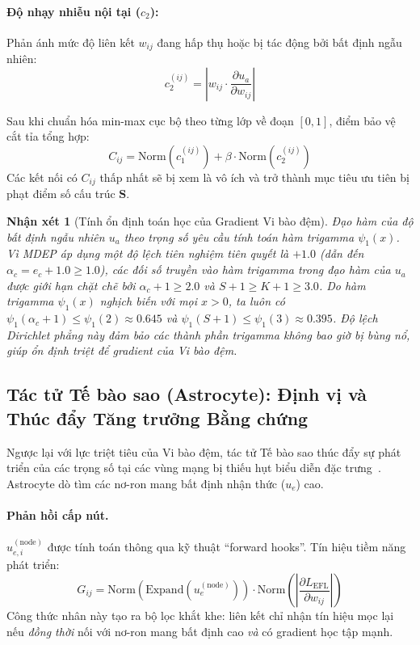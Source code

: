 \documentclass[11pt, a4paper]{article}
\newcommand{\Norm}{\text{Norm}}
\newtheorem{remark}{Nhận xét}
\begin{document}
\paragraph{Độ nhạy nhiễu nội tại ($c_2$):}
Phản ánh mức độ liên kết $w_{ij}$ đang hấp thụ hoặc bị tác động bởi bất định ngẫu nhiên:
\begin{equation}
    c_2^{(ij)} = \left| w_{ij} \cdot \frac{\partial u_a}{\partial w_{ij}} \right|
\end{equation}

Sau khi chuẩn hóa min-max cục bộ theo từng lớp về đoạn $[0, 1]$, điểm bảo vệ cắt tỉa tổng hợp:
\begin{equation}\label{eq:C_ij}
    C_{ij} = \Norm(c_1^{(ij)}) + \beta \cdot \Norm(c_2^{(ij)})
\end{equation}
Các kết nối có $C_{ij}$ thấp nhất sẽ bị xem là vô ích và trở thành mục tiêu ưu tiên bị phạt điểm số cấu trúc $\bm{S}$.

\begin{remark}[Tính ổn định toán học của Gradient Vi bào đệm]
Đạo hàm của độ bất định ngẫu nhiên $u_a$ theo trọng số yêu cầu tính toán hàm trigamma $\psi_1(x)$. Vì MDEP áp dụng một độ lệch tiên nghiệm tiên quyết là $+1.0$ (dẫn đến $\alpha_c = e_c + 1.0 \ge 1.0$), các đối số truyền vào hàm trigamma trong đạo hàm của $u_a$ được giới hạn chặt chẽ bởi $\alpha_c + 1 \ge 2.0$ và $S + 1 \ge K + 1 \ge 3.0$. Do hàm trigamma $\psi_1(x)$ nghịch biến với mọi $x > 0$, ta luôn có $\psi_1(\alpha_c+1) \le \psi_1(2) \approx 0.645$ và $\psi_1(S+1) \le \psi_1(3) \approx 0.395$. Độ lệch Dirichlet phẳng này đảm bảo các thành phần trigamma không bao giờ bị bùng nổ, giúp ổn định triệt để gradient của Vi bào đệm.
\end{remark}

\subsection{Tác tử Tế bào sao (Astrocyte): Định vị và Thúc đẩy Tăng trưởng Bằng chứng}\label{subsec:astrocyte}

Ngược lại với lực triệt tiêu của Vi bào đệm, tác tử Tế bào sao thúc đẩy sự phát triển của các trọng số tại các vùng mạng bị thiếu hụt biểu diễn đặc trưng~\cite{chung2013astrocytes, vainchtein2018astrocyte}. Astrocyte dò tìm các nơ-ron mang bất định nhận thức ($u_e$) cao.

\paragraph{Phản hồi cấp nút.}
$u_{e,i}^{(\text{node})}$ được tính toán thông qua kỹ thuật ``forward hooks''. Tín hiệu tiềm năng phát triển:
\begin{equation}\label{eq:G_ij}
    G_{ij} = \Norm\!\left(\text{Expand}(u_e^{(\text{node})})\right) \cdot \Norm\!\left(\left|\frac{\partial L_{\text{EFL}}}{\partial w_{ij}}\right|\right)
\end{equation}
Công thức nhân này tạo ra bộ lọc khắt khe: liên kết chỉ nhận tín hiệu mọc lại nếu \emph{đồng thời} nối với nơ-ron mang bất định cao \emph{và} có gradient học tập mạnh.
\end{document}
